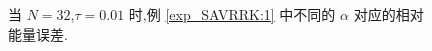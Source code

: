 \documentclass[aspectratio=169]{beamer}
\numberwithin{theorem}{section} %
\numberwithin{equation}{section}%
\numberwithin{figure}{section}%
\numberwithin{table}{section}%
\begin{document}
\begin{frame}%
	\begin{figure}[H]
		\begin{center}
		\caption{当 $N=32$,$\tau=0.01$ 时,例 \ref{exp_SAVRRK:1} 中不同的 $\alpha$ 对应的相对能量误差.}
		\label{fig_SAVRRK:4-1}
		\end{center}
		\end{figure}
\end{frame}
\end{document}
